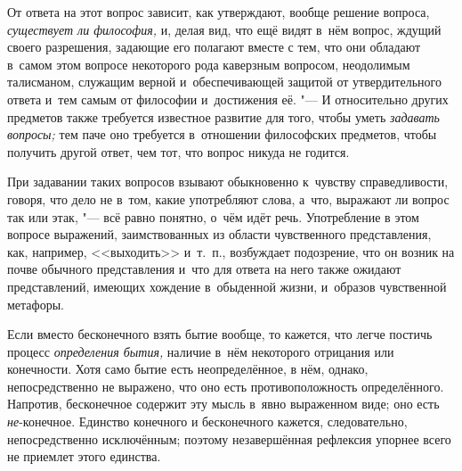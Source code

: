 От ответа на этот вопрос зависит, как утверждают, вообще решение вопроса,
{\em существует ли философия,} и, делая вид, что ещё
видят в~нём вопрос, ждущий своего разрешения, задающие его полагают вместе
с тем, что они обладают в~самом этом вопросе некоторого рода каверзным
вопросом, неодолимым талисманом, служащим верной и~обеспечивающей защитой
от утвердительного ответа и~тем самым от философии и~достижения её. "--- И
относительно других предметов также требуется известное развитие для того,
чтобы уметь {\em задавать вопросы;} тем паче оно
требуется в~отношении философских предметов, чтобы получить другой ответ,
чем тот, что вопрос никуда не годится.

При задавании таких вопросов взывают обыкновенно к~чувству справедливости,
говоря, что дело не в~том, какие употребляют слова, а~что, выражают ли
вопрос так или этак, "--- всё равно понятно, о~чём идёт речь. Употребление в
этом вопросе выражений, заимствованных из области чувственного
представления, как, например, <<выходить>> и~т.~п., возбуждает подозрение,
что он возник на почве обычного представления и~что для ответа на него
также ожидают представлений, имеющих хождение в~обыденной жизни, и~образов
чувственной метафоры.

Если вместо бесконечного взять бытие вообще, то кажется, что легче постичь
процесс {\em определения бытия,} наличие в~нём
некоторого отрицания или конечности. Хотя само бытие есть неопределённое, в
нём, однако, непосредственно не выражено, что оно есть противоположность
определённого. Напротив, бесконечное содержит эту мысль в~явно выраженном
виде; оно есть {\em не}{}-конечное. Единство конечного
и бесконечного кажется, следовательно, непосредственно исключённым; поэтому
незавершённая рефлексия упорнее всего не приемлет этого единства.

